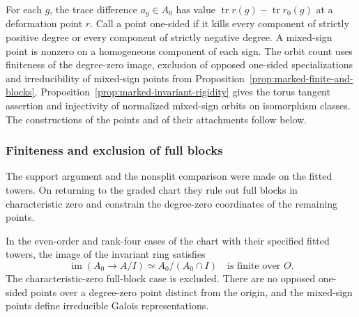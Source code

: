 For each \(g\), the trace difference \(a_g\in A_0\) has
value \(\operatorname{tr}r(g)-\operatorname{tr}r_0(g)\)
at a deformation point \(r\). Call a point one-sided if
it kills every component of strictly positive degree or
every component of strictly negative degree. A mixed-sign
point is nonzero on a homogeneous component of each sign. The orbit count
uses finiteness of the degree-zero image, exclusion of opposed
one-sided specializations and irreducibility of mixed-sign points
from Proposition~\ref{prop:marked-finite-and-blocks}.
Proposition~\ref{prop:marked-invariant-rigidity} gives
the torus tangent assertion and injectivity of normalized
mixed-sign orbits on isomorphism classes. The constructions of
the points and of their attachments follow below.
\label{cor:ordinary-symplectic-cohomology-9}





\subsubsection{Finiteness and exclusion of full blocks}

The support argument and the nonsplit comparison were made on the fitted towers. On returning to the graded chart they rule out full blocks in characteristic zero and constrain the degree-zero coordinates of the remaining points.

\begin{proposition}\label{prop:marked-finite-and-blocks}
In the even-order and rank-four cases of the chart with their
specified fitted towers, the image of the invariant ring satisfies 
\[
 \operatorname{im}(A_0\longrightarrow A/I)\simeq A_0/(A_0\cap I)\quad\text{is finite over }O.
\]
 The characteristic-zero full-block case
is excluded. There are no opposed one-sided points over a
degree-zero point distinct from the origin, and the mixed-sign
points define irreducible Galois representations.
\end{proposition}

